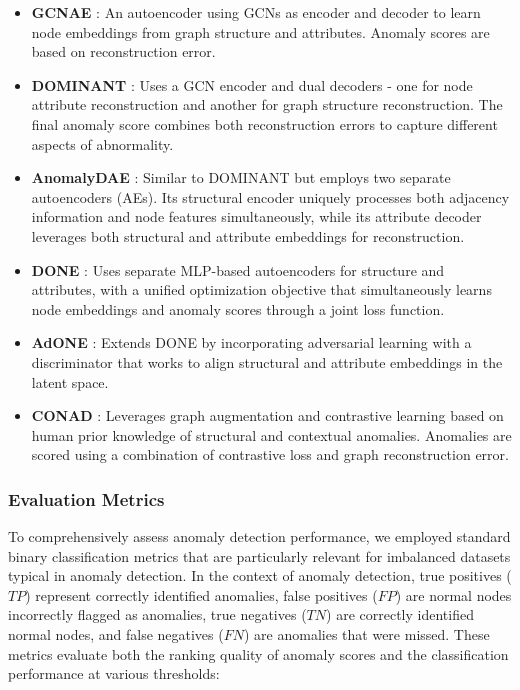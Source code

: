 \documentclass[preprint,12pt]{elsarticle}
\theoremstyle{plain}
\theoremstyle{definition}
\theoremstyle{remark}
\begin{document}
\begin{itemize}
    \item \textbf{GCNAE} \cite{kipf2016variational,NEURIPS2022-acc1ec4a}: An autoencoder using GCNs as encoder and decoder to learn node embeddings from graph structure and attributes. Anomaly scores are based on reconstruction error.
    \item \textbf{DOMINANT} \cite{ding2019deep}: Uses a GCN encoder and dual decoders - one for node attribute reconstruction and another for graph structure reconstruction. The final anomaly score combines both reconstruction errors to capture different aspects of abnormality.
    \item \textbf{AnomalyDAE} \cite{fan2020anomalydae}: Similar to DOMINANT but employs two separate autoencoders (AEs). Its structural encoder uniquely processes both adjacency information and node features simultaneously, while its attribute decoder leverages both structural and attribute embeddings for reconstruction.
    \item \textbf{DONE} \cite{bandyopadhyay2020outlier}: Uses separate MLP-based autoencoders for structure and attributes, with a unified optimization objective that simultaneously learns node embeddings and anomaly scores through a joint loss function.
    \item \textbf{AdONE} \cite{bandyopadhyay2020outlier}: Extends DONE by incorporating adversarial learning with a discriminator that works to align structural and attribute embeddings in the latent space.
    \item \textbf{CONAD} \cite{xu2022contrastive}: Leverages graph augmentation and contrastive learning based on human prior knowledge of structural and contextual anomalies. Anomalies are scored using a combination of contrastive loss and graph reconstruction error.
\end{itemize}

\subsubsection{Evaluation Metrics}
To comprehensively assess anomaly detection performance, we employed standard binary classification metrics that are particularly relevant for imbalanced datasets typical in anomaly detection. In the context of anomaly detection, true positives ($TP$) represent correctly identified anomalies, false positives ($FP$) are normal nodes incorrectly flagged as anomalies, true negatives ($TN$) are correctly identified normal nodes, and false negatives ($FN$) are anomalies that were missed. These metrics evaluate both the ranking quality of anomaly scores and the classification performance at various thresholds:
\end{document}
